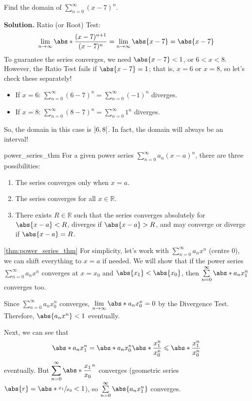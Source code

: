 \begin{Example}{}{}
    Find the domain of $ \displaystyle \sum\limits_{n=0}^{\infty} (x-7)^n $.

    \textbf{Solution.} Ratio (or Root) Test:
    \[ \lim\limits_{{n} \to {\infty}} \abs*{\frac{(x-7)^{n+1}}{(x-7)^n}}
        =\lim\limits_{{n} \to {\infty}} \abs{x-7}
        =\abs{x-7} \]
    To guarantee the series converges, we need $ \abs{x-7}<1 $,
    or $ 6<x<8 $. However, the Ratio Test fails if $ \abs{x-7}=1 $; that is,
    $ x=6 $ or $ x=8 $, so let's check these separately!
    \begin{itemize}
        \item If $ x=6 $: $ \sum\limits_{n=0}^{\infty} (6-7)^n=\sum\limits_{n=0}^{\infty} (-1)^n $
              diverges.
        \item If $ x=8 $: $ \sum\limits_{n=0}^{\infty} (8-7)^n=\sum\limits_{n=0}^{\infty}1^n $
              diverges.
    \end{itemize}
    So, the domain in this case is $ \interval[open]{6}{8} $.
    In fact, the domain will always be an interval!
\end{Example}

\begin{Theorem}{}{power_series_thm}
    For a given power series $ \sum\limits_{n=0}^{\infty} a_n(x-a)^n $, there are
    three possibilities:
    \begin{enumerate}[label=(\arabic*)]
        \item\label{power_1} The series converges only when $ x=a $.
        \item\label{power_2} The series converges for all $ x\in\mathbb{R} $.
        \item\label{power_3} There exists $ R\in\mathbb{R} $ such that the series converges
              absolutely for $ \abs{x-a}<R $, diverges if $ \abs{x-a}>R $, and may converge
              or diverge if $ \abs{x-a}=R $.
    \end{enumerate}
\end{Theorem}

\begin{Proof}{\ref{thm:power_series_thm}}{}
    For simplicity, let's work with $ \sum\limits_{n=0}^{\infty} a_n x^n $ (centre 0),
    we can shift everything to $ x=a $ if needed. We will show that if the power series
    $ \sum\limits_{n=0}^{\infty} a_n x^n $ converges at $ x=x_0 $ and $ \abs{x_1}<\abs{x_0} $,
    then $ \sum\limits_{n=0}^{\infty} \abs*{a_n x_1^n} $ converges too.

    Since
    $ \sum\limits_{n=0}^{\infty} a_n x_0^n $ converges, $ \lim\limits_{{n} \to {\infty}}
        \abs*{a_n x_0^n}=0 $ by the Divergence Test. Therefore, $ \abs{a_n x^n}<1 $ eventually.

    Next, we can see that
    \[ \abs*{a_n x_1^n}=\abs*{a_n x_0^n}\abs*{\frac{x_1^n}{x_0^n}}\leqslant \abs*{\frac{x_1^n}{x_0^n}} \]
    eventually. But $ \displaystyle \sum\limits_{n=0}^{\infty} \abs*{\frac{x_1}{x_0}}^n $ converges
    (geometric series $ \abs{r}=\abs*{\sfrac{x_1}{x_0}}<1 $), so $ \sum\limits_{n=0}^{\infty}
        \abs{a_n x_1^n} $
    converges.
\end{Proof}

